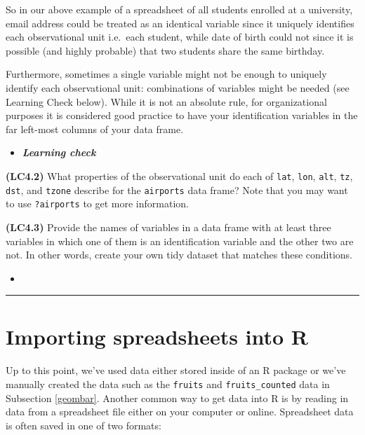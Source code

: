 \documentclass[12pt,]{krantz}
\newenvironment{rmdblock}[1]
  {\begin{shaded*}
  \begin{itemize}
  \renewcommand{\labelitemi}{
    \raisebox{-.7\height}[0pt][0pt]{
    }
  }
  \item
  }
  {
  \end{itemize}
  \end{shaded*}
  }
\newenvironment{learncheck}
  {\begin{rmdblock}{warning}}
  {\end{rmdblock}}
\theoremstyle{definition}
\theoremstyle{definition}
\theoremstyle{definition}
\theoremstyle{remark}
\begin{document}
So in our above example of a spreadsheet of all students enrolled at a
university, email address could be treated as an identical variable
since it uniquely identifies each observational unit i.e.~each student,
while date of birth could not since it is possible (and highly probable)
that two students share the same birthday.

Furthermore, sometimes a single variable might not be enough to uniquely
identify each observational unit: combinations of variables might be
needed (see Learning Check below). While it is not an absolute rule, for
organizational purposes it is considered good practice to have your
identification variables in the far left-most columns of your data
frame.

\begin{learncheck}
\textbf{\emph{Learning check}}
\end{learncheck}

\textbf{(LC4.2)} What properties of the observational unit do each of
\texttt{lat}, \texttt{lon}, \texttt{alt}, \texttt{tz}, \texttt{dst}, and
\texttt{tzone} describe for the \texttt{airports} data frame? Note that
you may want to use \texttt{?airports} to get more information.

\textbf{(LC4.3)} Provide the names of variables in a data frame with at
least three variables in which one of them is an identification variable
and the other two are not. In other words, create your own tidy dataset
that matches these conditions.

\begin{learncheck}

\end{learncheck}

\begin{center}\rule{0.5\linewidth}{\linethickness}\end{center}

\section{Importing spreadsheets into R}\label{csv}

Up to this point, we've used data either stored inside of an R package
or we've manually created the data such as the \texttt{fruits} and
\texttt{fruits\_counted} data in Subsection \ref{geombar}. Another
common way to get data into R is by reading in data from a spreadsheet
file either on your computer or online. Spreadsheet data is often saved
in one of two formats:
\end{document}
